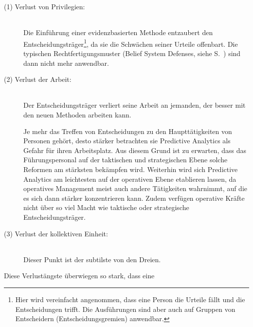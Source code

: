 \begin{description}
\item[(1) Verlust von Privilegien:] \hfill \\
Die Einführung einer evidenzbasierten Methode entzaubert den Entscheidungsträger\footnote{
Hier wird vereinfacht angenommen, dass eine Person die Urteile fällt und die Entscheidungen
trifft. Die Ausführungen sind aber auch auf Gruppen von Entscheidern (Entscheidungsgremien)
anwendbar.
}, da sie die Schwächen seiner Urteile offenbart. Die typischen Rechtfertigungsmuster
(Belief System Defenses, siehe S.~\xcom)
sind dann nicht mehr anwendbar.

\item[(2) Verlust der Arbeit:] \hfill \\
Der Entscheidungsträger verliert seine Arbeit an jemanden, der besser mit den neuen Methoden
arbeiten kann. 


Je mehr das Treffen von Entscheidungen zu den Haupttätigkeiten von Personen
gehört, desto stärker betrachten sie Predictive Analytics als Gefahr für ihren
Arbeitsplatz. Aus diesem Grund ist zu erwarten, dass das Führungspersonal auf der taktischen
und strategischen Ebene solche Reformen am stärksten bekämpfen wird. Weiterhin wird sich Predictive
Analytics am leichtesten auf der operativen Ebene etablieren lassen, da operatives Management meist
auch andere Tätigkeiten wahrnimmt, auf die es sich dann stärker konzentrieren kann. Zudem verfügen
operative Kräfte nicht über so viel Macht wie taktische oder strategische Entscheidungsträger.

\item[(3) Verlust der kollektiven Einheit:] \hfill \\
Dieser Punkt ist der subtilste von den Dreien.


\end{description}

Diese Verlustängste überwiegen so stark, dass eine 





